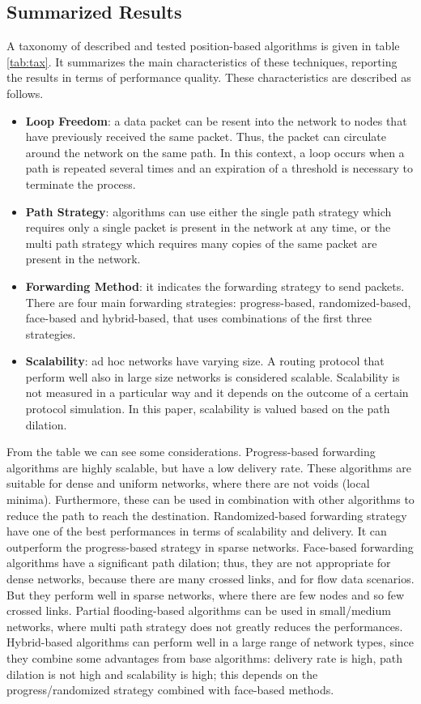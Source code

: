 \documentclass[journal,comsoc]{IEEEtran}
\begin{document}
\subsection{Summarized Results}
A taxonomy of described and tested position-based algorithms is given in table \ref{tab:tax}. It summarizes the main characteristics of these techniques, reporting the results in terms of performance quality. These characteristics are described as follows.
\begin{itemize}
\item \textbf{Loop Freedom}: a data packet can be resent into the network to nodes that have previously received the same packet. Thus, the packet can circulate around the network on the same path. In this context, a loop occurs when a path is repeated several times and an expiration of a threshold is necessary to terminate the process.
\item \textbf{Path Strategy}: algorithms can use either the single path strategy which requires only a single packet is present in the network at any time, or the multi path strategy which requires many copies of the same packet are present in the network.
\item \textbf{Forwarding Method}: it indicates the forwarding strategy to send packets. There are four main forwarding strategies: progress-based, randomized-based, face-based and hybrid-based, that uses combinations of the first three strategies.
\item \textbf{Scalability}: ad hoc networks have varying size. A routing protocol that perform well also in large size networks is considered scalable. Scalability is not measured in a particular way and it depends on the outcome of a certain protocol simulation. In this paper, scalability is valued based on the path dilation.
\end{itemize}
From the table we can see some considerations. Progress-based forwarding algorithms are highly scalable, but have a low delivery rate. These algorithms are suitable for dense and uniform networks, where there are not voids (local minima). Furthermore, these can be used in combination with other algorithms to reduce the path to reach the destination.
Randomized-based forwarding strategy have one of the best performances in terms of scalability and delivery. It can outperform the progress-based strategy in sparse networks.
Face-based forwarding algorithms have a significant path dilation; thus, they are not appropriate for dense networks, because there are many crossed links, and for flow data scenarios. But they perform well in sparse networks, where there are few nodes and so few crossed links.
Partial flooding-based algorithms can be used in small/medium networks, where multi path strategy does not greatly reduces the performances.
Hybrid-based algorithms can perform well in a large range of network types, since they combine some advantages from base algorithms: delivery rate is high, path dilation is not high and scalability is high; this depends on the progress/randomized strategy combined with face-based methods.
\end{document}
